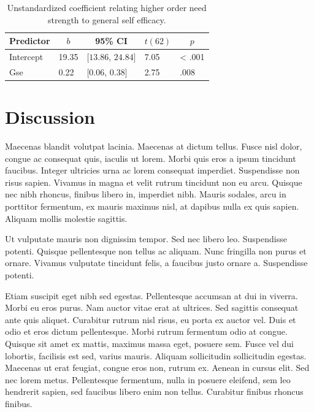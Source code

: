 \documentclass[english,,man]{apa6}
\begin{document}
\begin{table}[tbp]
\begin{center}
\begin{threeparttable}
\caption{\label{tab:unnamed-chunk-6}Unstandardized coefficient relating higher order need strength to general self efficacy.}
\begin{tabular}{lllll}
\toprule
Predictor & \multicolumn{1}{c}{$b$} & \multicolumn{1}{c}{95\% CI} & \multicolumn{1}{c}{$t(62)$} & \multicolumn{1}{c}{$p$}\\
\midrule
Intercept & 19.35 & $[13.86$, $24.84]$ & 7.05 & < .001\\
Gse & 0.22 & $[0.06$, $0.38]$ & 2.75 & .008\\
\bottomrule
\end{tabular}
\end{threeparttable}
\end{center}
\end{table}

\hypertarget{discussion}{%
\section{Discussion}\label{discussion}}

Maecenas blandit volutpat lacinia. Maecenas at dictum tellus. Fusce nisl dolor, congue ac consequat quis, iaculis ut lorem. Morbi quis eros a ipsum tincidunt faucibus. Integer ultricies urna ac lorem consequat imperdiet. Suspendisse non risus sapien. Vivamus in magna et velit rutrum tincidunt non eu arcu. Quisque nec nibh rhoncus, finibus libero in, imperdiet nibh. Mauris sodales, arcu in porttitor fermentum, ex mauris maximus nisl, at dapibus nulla ex quis sapien. Aliquam mollis molestie sagittis.

Ut vulputate mauris non dignissim tempor. Sed nec libero leo. Suspendisse potenti. Quisque pellentesque non tellus ac aliquam. Nunc fringilla non purus et ornare. Vivamus vulputate tincidunt felis, a faucibus justo ornare a. Suspendisse potenti.

Etiam suscipit eget nibh sed egestas. Pellentesque accumsan at dui in viverra. Morbi eu eros purus. Nam auctor vitae erat at ultrices. Sed sagittis consequat ante quis aliquet. Curabitur rutrum nisl risus, eu porta ex auctor vel. Duis et odio et eros dictum pellentesque. Morbi rutrum fermentum odio at congue. Quisque sit amet ex mattis, maximus massa eget, posuere sem. Fusce vel dui lobortis, facilisis est sed, varius mauris. Aliquam sollicitudin sollicitudin egestas. Maecenas ut erat feugiat, congue eros non, rutrum ex. Aenean in cursus elit. Sed nec lorem metus. Pellentesque fermentum, nulla in posuere eleifend, sem leo hendrerit sapien, sed faucibus libero enim non tellus. Curabitur finibus rhoncus finibus.
\end{document}
